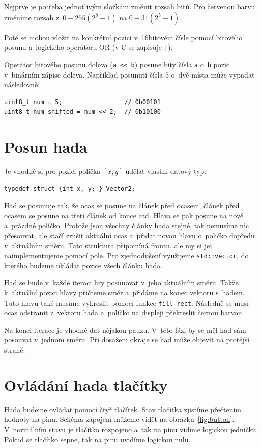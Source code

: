 \documentclass[12pt]{article}
\begin{document}
Nejprve je potřeba jednotlivým složkám změnit rozsah bitů.
Pro červenou barvu změníme rozsah z~$0 - 255 (2^8-1)$ na $0 - 31 (2^{5}-1)$.

Poté se mohou vložit na konkrétní pozici v~16bitovém čísle pomocí bitového posunu a~logického operátoru OR (v C se zapisuje \texttt{|}).

Operátor bitového posunu doleva (\texttt{a << b}) posune bity čísla \texttt{a} o~\texttt{b} pozic v~binárním zápise doleva.
Například posunutí čísla $5$ o~dvě místa může vypadat následovně:
\begin{verbatim}
uint8_t num = 5;                 // 0b00101
uint8_t num_shifted = num << 2;  // 0b10100
\end{verbatim}


\section{Posun hada}
Je vhodné si pro pozici políčka $[x, y]$ udělat vlastní datový typ:
\begin{verbatim}
typedef struct {int x, y; } Vector2;
\end{verbatim}

Had se posunuje tak, že ocas se posune na článek před ocasem, článek před ocasem se posune na třetí článek od konce atd.
Hlava se pak posune na nové a~prázdné políčko.
Protože jsou všechny články hada stejné, tak nemusíme nic přesouvat, ale stačí zrušit aktuální ocas a~přidat novou hlavu o~poličko dopředu v~aktuálním směru.
Tato struktura připomíná frontu, ale my si jej naimplementujeme pomocí pole.
Pro zjednodušení využijeme \texttt{std::vector}, do kterého budeme ukládat pozice všech článku hada.

Had se bude v~každé iteraci hry posunovat v~jeho aktuálním směru.
Takže k~aktuální pozici hlavy přičteme směr a~přidáme na konec vektoru s~hadem.
Tuto hlavu také musíme vykreslit pomocí funkce \texttt{fill_rect}.
Následně se musí ocas odstranit z~vektoru hada a~políčko na displeji překreslit černou barvou.

Na konci iterace je vhodné dat nějakou pauzu.
V~této fázi by se měl had sám posouvat v~jednom směru.
Při dosaženi okraje se had může objevit na protější straně.

\section{Ovládání hada tlačítky}
Hada budeme ovládat pomocí čtyř tlačítek.
Stav tlačítka zjistíme přečtením hodnoty na pinu.
Schéma zapojení můžeme vidět na obrázku~\ref{fig:button}.
V~normálním stavu je tlačítko rozpojeno a~tak na pinu vidíme logickou jedničku.
Pokud se tlačítko sepne, tak na pinu uvidíme logickou nulu.
\end{document}
